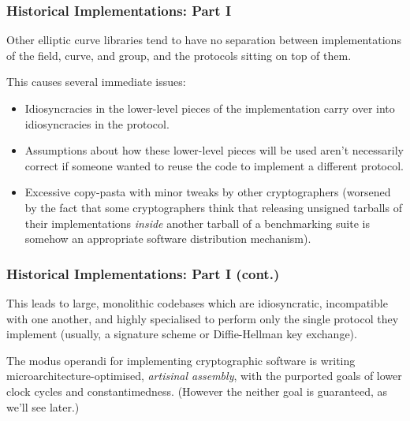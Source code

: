 \documentclass[xetex,aspectratio=169]{beamer}
\begin{document}
  \begin{frame}
    \frametitle{Historical Implementations: Part I}

    Other elliptic curve libraries tend to have no separation between
    implementations of the field, curve, and group, and the protocols sitting on
    top of them.

    \pause This causes several immediate issues:

    {\small
    \begin{itemize}
      \item<3-> Idiosyncracies in the lower-level pieces of the implementation
        carry over into idiosyncracies in the protocol.
      \item<4-> Assumptions about how these lower-level pieces will be used
        aren't necessarily correct if someone wanted to reuse the code to
        implement a different protocol.
      \item<5-> Excessive copy-pasta with minor tweaks by other cryptographers
        (worsened by the fact that some cryptographers think that
        releasing unsigned tarballs of their implementations \emph{inside} another
        tarball of a benchmarking suite is somehow an appropriate software
        distribution mechanism).
    \end{itemize}
    }
  \end{frame}


  \begin{frame}
    \frametitle{Historical Implementations: Part I (cont.)}

    This leads to large, monolithic codebases which are idiosyncratic,
    incompatible with one another, and highly specialised to perform only the
    single protocol they implement (usually, a signature scheme or
    Diffie-Hellman key exchange).

    The modus operandi for implementing cryptographic software is
    writing microarchitecture-optimised, \emph{artisinal assembly},
    with the purported goals of lower clock cycles and
    constantimedness. (However the neither goal is guaranteed, as
    we'll see later.)

  \end{frame}


%
%
%
%
%
\end{document}
